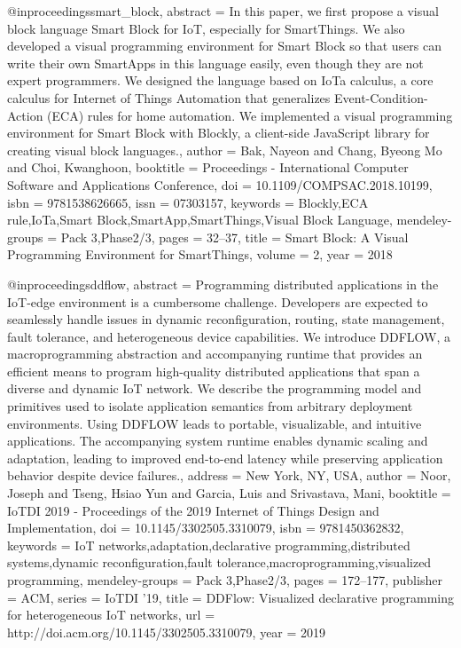 @inproceedings{smart_block,
    abstract = {In this paper, we first propose a visual block language Smart Block for IoT, especially for SmartThings. We also developed a visual programming environment for Smart Block so that users can write their own SmartApps in this language easily, even though they are not expert programmers. We designed the language based on IoTa calculus, a core calculus for Internet of Things Automation that generalizes Event-Condition-Action (ECA) rules for home automation. We implemented a visual programming environment for Smart Block with Blockly, a client-side JavaScript library for creating visual block languages.},
    author = {Bak, Nayeon and Chang, Byeong Mo and Choi, Kwanghoon},
    booktitle = {Proceedings - International Computer Software and Applications Conference},
    doi = {10.1109/COMPSAC.2018.10199},
    isbn = {9781538626665},
    issn = {07303157},
    keywords = {Blockly,ECA rule,IoTa,Smart Block,SmartApp,SmartThings,Visual Block Language},
    mendeley-groups = {Pack 3,Phase2/3},
    pages = {32--37},
    title = {{Smart Block: A Visual Programming Environment for SmartThings}},
    volume = {2},
    year = {2018}
}

@inproceedings{ddflow,
    abstract = {Programming distributed applications in the IoT-edge environment is a cumbersome challenge. Developers are expected to seamlessly handle issues in dynamic reconfiguration, routing, state management, fault tolerance, and heterogeneous device capabilities. We introduce DDFLOW, a macroprogramming abstraction and accompanying runtime that provides an efficient means to program high-quality distributed applications that span a diverse and dynamic IoT network. We describe the programming model and primitives used to isolate application semantics from arbitrary deployment environments. Using DDFLOW leads to portable, visualizable, and intuitive applications. The accompanying system runtime enables dynamic scaling and adaptation, leading to improved end-to-end latency while preserving application behavior despite device failures.},
    address = {New York, NY, USA},
    author = {Noor, Joseph and Tseng, Hsiao Yun and Garcia, Luis and Srivastava, Mani},
    booktitle = {IoTDI 2019 - Proceedings of the 2019 Internet of Things Design and Implementation},
    doi = {10.1145/3302505.3310079},
    isbn = {9781450362832},
    keywords = {IoT networks,adaptation,declarative programming,distributed systems,dynamic reconfiguration,fault tolerance,macroprogramming,visualized programming},
    mendeley-groups = {Pack 3,Phase2/3},
    pages = {172--177},
    publisher = {ACM},
    series = {IoTDI '19},
    title = {{DDFlow: Visualized declarative programming for heterogeneous IoT networks}},
    url = {http://doi.acm.org/10.1145/3302505.3310079},
    year = {2019}
}

